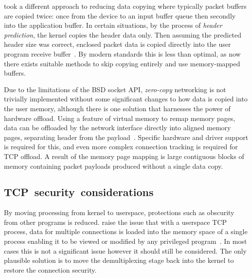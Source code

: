 \documentclass[11pt,a4paper,british]{bhamarticle}
\begin{document}
\begin{multicols}{2}
\citeauthor{braun:inria-00074040} took a different approach to reducing data copying where typically packet buffers are copied twice: once from the device to an input buffer queue then secondly into the application buffer. In certain situations, by the process of \textit{header prediction}, the kernel copies the header data only. Then assuming the predicted header size was correct, enclosed packet data is copied directly into the user program receive buffer~\cite[4.1]{braun:inria-00074040}. By modern standards this is less than optimal, as now there exists suitable methods to skip copying entirely and use memory-mapped buffers.

Due to the limitations of the BSD socket API, \textit{zero-copy} networking is not trivially implemented without some significant changes to how data is copied into the user memory, although there is one solution that harnesses the power of hardware offload. Using a feature of virtual memory to remap memory pages, data can be offloaded by the network interface directly into aligned memory pages, separating header from the payload~\cite[2.3]{chase2001end}. Specific hardware and driver support is required for this, and even more complex connection tracking is required for TCP offload. A result of the memory page mapping is large contiguous blocks of memory containing packet payloads produced without a single data copy.

\subsection{\mbox{TCP security considerations}}
By moving processing from kernel to userspace, protections such as obscurity from other programs is reduced. \citeauthor{braun:inria-00074040} raise the issue that with a userspace TCP process, data for multiple connections is loaded into the memory space of a single process enabling it to be viewed or modified by any privileged program~\cite[1, 2.1]{braun:inria-00074040}. In most cases this is not a significant issue however it should still be considered. The only plausible solution is to move the demultiplexing stage back into the kernel to restore the connection security.



\end{multicols}
\end{document}

